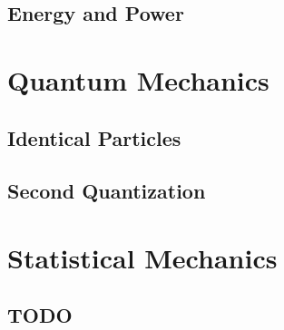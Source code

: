 \documentclass[
  letterpaper,
  DIV=11,
  numbers=noendperiod]{scrreprt}
\begin{document}
\hypertarget{energy-and-power}{%
\chapter{Energy and Power}\label{energy-and-power}}

\part{Quantum Mechanics}

\hypertarget{identical-particles}{%
\chapter{Identical Particles}\label{identical-particles}}

\hypertarget{second-quantization}{%
\chapter{Second Quantization}\label{second-quantization}}

\part{Statistical Mechanics}

\hypertarget{todo}{%
\chapter{TODO}\label{todo}}
\end{document}
